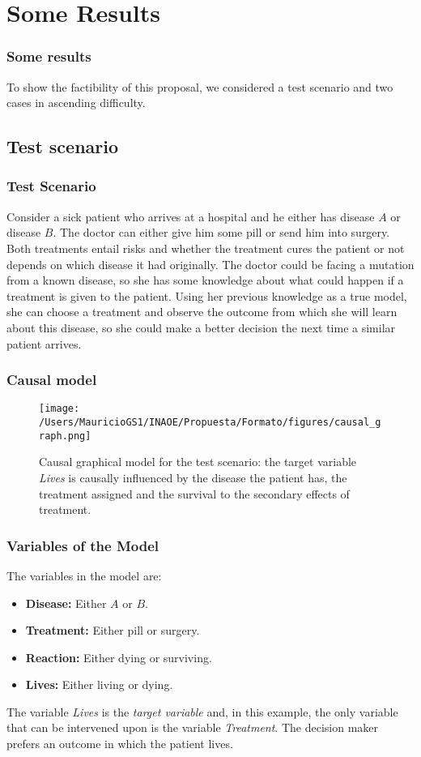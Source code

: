 \documentclass{beamer}
\theoremstyle{plain}
\begin{document}
\section{Some Results}
\begin{frame}
\frametitle{Some results}
To show the factibility of this proposal, we considered a test scenario and two cases in ascending difficulty.
\end{frame}
\subsection{Test scenario}
\begin{frame}
\frametitle{Test Scenario}
Consider a sick patient who arrives at a hospital and he either has disease $A$ or disease $B$. The doctor can either give him some pill or send him into surgery.  Both treatments entail risks and whether the treatment cures the patient or not depends on which disease it had originally. The doctor could be facing a mutation from a known disease, so she has some knowledge about what could happen if a treatment is given to the patient. Using her previous knowledge as a true model, she can choose a treatment and observe the outcome from which she will learn about this disease, so she could make a better decision the next time a similar patient arrives.
\end{frame}

\begin{frame}
\frametitle{Causal model}
\begin{figure}[ht]
\vskip 0.2in
\begin{center}
\centerline{\texttt{[image: /Users/MauricioGS1/INAOE/Propuesta/Formato/figures/causal\_graph.png]}}
\caption{Causal graphical model for the test scenario: the target variable \textit{Lives} is causally influenced by the disease the patient has, the treatment assigned and the survival to the secondary effects of treatment.}
\label{causal_model}
\end{center}
\vskip -0.2in
\end{figure}
\end{frame}

\begin{frame}
\frametitle{Variables of the Model}
The variables in the model are: 
\begin{itemize}
\item \textbf{Disease:} Either $A$ or $B$.
\item \textbf{Treatment:} Either pill or surgery.
\item \textbf{Reaction:} Either dying or surviving.
\item \textbf{Lives:} Either living or dying.
\end{itemize}
The variable \textit{Lives} is the \textit{target variable} and, in this example, the only variable that can be intervened upon is the variable \textit{Treatment}. The decision maker prefers an outcome in which the patient lives.
\end{frame}
\end{document}
